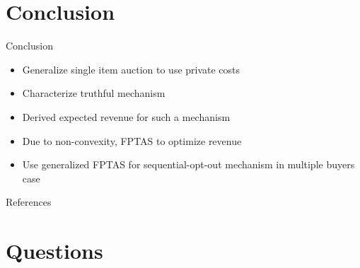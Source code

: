\documentclass{beamer}
\begin{document}
\section{Conclusion}
\begin{frame}{Conclusion}
  \begin{itemize}
    \item Generalize single item auction to use private costs
    \item Characterize truthful mechanism
    \item Derived expected revenue for such a mechanism
    \item Due to non-convexity, FPTAS to optimize revenue
    \item Use generalized FPTAS for sequential-opt-out mechanism in multiple buyers case
  \end{itemize}
\end{frame}

\begin{frame}{References}
  \printbibliography[heading=none]
\end{frame}

\section{Questions}
\end{document}
